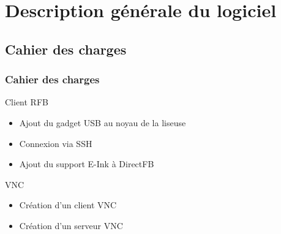 \section[Description]{Description générale du logiciel}

\subsection{Cahier des charges}


\begin{frame}

 \frametitle{Cahier des charges}


%






%




%
%
%
%


\begin{block}{Client RFB}
\begin{itemize}
\item Ajout du gadget USB au noyau de la liseuse
\item Connexion via SSH
\item Ajout du support E-Ink à DirectFB
\end{itemize}
\end{block}

\begin{block}{VNC}
\begin{itemize}
\item Création d'un client VNC
\item Création d'un serveur VNC
\end{itemize}
\end{block}


\end{frame}


